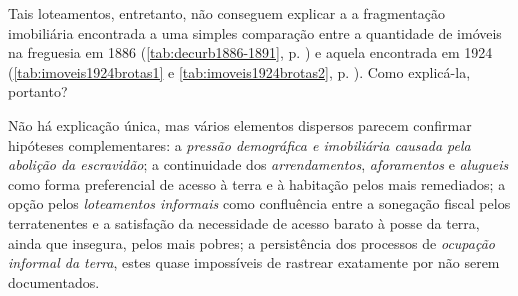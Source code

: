 

Tais loteamentos, entretanto, não conseguem explicar a a fragmentação imobiliária encontrada a uma simples comparação entre a quantidade de imóveis na freguesia em 1886 (\autoref{tab:decurb1886-1891}, p. \pageref{tab:decurb1886-1891}) e aquela encontrada em 1924 (\autoref{tab:imoveis1924brotas1} e \autoref{tab:imoveis1924brotas2}, p. \pageref{tab:imoveis1924brotas2}). Como explicá-la, portanto?

Não há explicação única, mas vários elementos dispersos parecem confirmar hipóteses complementares: a \textit{pressão demográfica e imobiliária causada pela abolição da escravidão}; a continuidade dos \textit{arrendamentos}, \textit{aforamentos} e \textit{alugueis} como forma preferencial de acesso à terra e à habitação pelos mais remediados; a opção pelos \textit{loteamentos informais} como confluência entre a sonegação fiscal pelos terratenentes e a satisfação da necessidade de acesso barato à posse da terra, ainda que insegura, pelos mais pobres; a persistência dos processos de \textit{ocupação informal da terra}, estes quase impossíveis de rastrear exatamente por não serem documentados.

